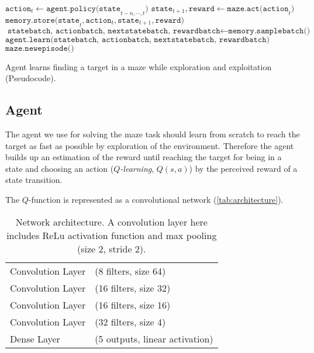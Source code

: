 \documentclass[a4paper,14pt]{article}
\begin{document}
\begin{algorithm}
  \begin{algorithmic}
      \State $\texttt{action}_t \gets \texttt{agent.policy(state}_{t-n, \cdots, t})$
    \State $\texttt{state}_{t+1}, \texttt{reward} \gets \texttt{maze.act(action}_t\texttt{)}$
    \State $\texttt{memory.store(state}_t, \texttt{action}_t, \texttt{state}_{t+1}, \texttt{reward)}$
    \State $\texttt{statebatch, actionbatch, nextstatebatch, rewardbatch} \gets \texttt{memory.samplebatch()}$
      \State $\texttt{agent.learn(statebatch, actionbatch, nextstatebatch, rewardbatch)}$
      \EndIf
        \State $\texttt{maze.newepisode()}$
      \EndIf
    \EndFor
  \end{algorithmic}
  \caption{Agent learns finding a target in a maze while exploration and exploitation (Pseudocode).}
  \label{alg:train}
\end{algorithm}

\subsection{Agent}

The agent we use for solving the maze task should learn from scratch to reach
the target as fast as possible by exploration of the environment.
Therefore the agent builds up an estimation of the reward until reaching the
target for being in a state and choosing an action ($Q$\textit{-learning},
$Q(s,a)$) by the perceived reward of a state transition.

The $Q$-function is represented as a convolutional network (\autoref{tab:architecture}).

\begin{table}[h]
  \centering
  \begin{tabular}{ll}
    \hline
    Convolution Layer & (8 filters, size 64) \\
    Convolution Layer & (16 filters, size 32) \\
    Convolution Layer & (16 filters, size 16) \\
    Convolution Layer & (32 filters, size 4) \\
    Dense Layer & (5 outputs, linear activation) \\
    \hline
  \end{tabular}
  \caption{Network architecture. A convolution layer here includes ReLu
    activation function and max pooling (size 2, stride 2).}
  \label{tab:architecture}
\end{table}
\end{document}
